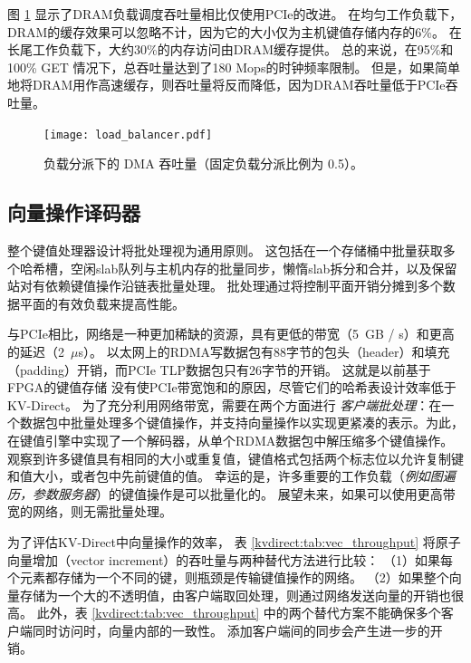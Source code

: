 图 \ref {kvdirect:fig:cache-tput} 显示了DRAM负载调度吞吐量相比仅使用PCIe的改进。
在均匀工作负载下，DRAM的缓存效果可以忽略不计，因为它的大小仅为主机键值存储内存的6\%。
在长尾工作负载下，大约30\%的内存访问由DRAM缓存提供。 总的来说，在95\%和100\% GET 情况下，总吞吐量达到了180 Mops的时钟频率限制。
但是，如果简单地将DRAM用作高速缓存，则吞吐量将反而降低，因为DRAM吞吐量低于PCIe吞吐量。


\begin{figure}[htbp]
	\centering
	{\texttt{[image: load\_balancer.pdf]}}
	\caption{负载分派下的 DMA 吞吐量（固定负载分派比例为 0.5）。}
	\label{kvdirect:fig:cache-tput}
\end{figure}



\subsection{向量操作译码器}

整个键值处理器设计将批处理视为通用原则。
这包括在一个存储桶中批量获取多个哈希槽，空闲slab队列与主机内存的批量同步，懒惰slab拆分和合并，以及保留站对有依赖键值操作沿链表批量处理。
批处理通过将控制平面开销分摊到多个数据平面的有效负载来提高性能。

与PCIe相比，网络是一种更加稀缺的资源，具有更低的带宽（5~GB / s）和更高的延迟（2~$\mu$s）。
以太网上的RDMA写数据包有88字节的包头（header）和填充（padding）开销，而PCIe TLP数据包只有26字节的开销。
这就是以前基于FPGA的键值存储 \cite{blott13hotcloud,blott2015scaling} 没有使PCIe带宽饱和的原因，尽管它们的哈希表设计效率低于KV-Direct。
为了充分利用网络带宽，需要在两个方面进行 \textit {客户端批处理}：在一个数据包中批量处理多个键值操作，并支持向量操作以实现更紧凑的表示。为此，在键值引擎中实现了一个解码器，从单个RDMA数据包中解压缩多个键值操作。
观察到许多键值具有相同的大小或重复值，键值格式包括两个标志位以允许复制键和值大小，或者包中先前键值的值。
幸运的是，许多重要的工作负载（\textit {例如图遍历，参数服务器}）的键值操作是可以批量化的。
展望未来，如果可以使用更高带宽的网络，则无需批量处理。


为了评估KV-Direct中向量操作的效率，
表 \ref {kvdirect:tab:vec_throughput} 将原子向量增加（vector increment）的吞吐量与两种替代方法进行比较：
（1）如果每个元素都存储为一个不同的键，则瓶颈是传输键值操作的网络。
（2）如果整个向量存储为一个大的不透明值，由客户端取回处理，则通过网络发送向量的开销也很高。
此外，表 \ref {kvdirect:tab:vec_throughput} 中的两个替代方案不能确保多个客户端同时访问时，向量内部的一致性。 添加客户端间的同步会产生进一步的开销。


